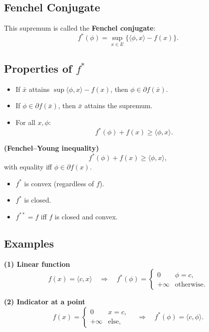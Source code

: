 \documentclass[12pt,oneside]{book}
\numberwithin{equation}{section}
\theoremstyle{definition}
\theoremstyle{plain}
\theoremstyle{remark}
\begin{document}
\subsection*{Fenchel Conjugate}

This supremum is called the \textbf{Fenchel conjugate}:
\[
f^*(\phi) = \sup_{x \in E} \{\langle \phi, x \rangle - f(x)\}.
\]

\subsection*{Properties of $f^*$}

\begin{itemize}
\item[(1)] If $\bar{x}$ attains $\sup \langle \phi,x\rangle - f(x)$, then $\phi \in \partial f(\bar{x})$.
\item[(2)] If $\phi \in \partial f(\bar{x})$, then $\bar{x}$ attains the supremum.
\item[(3)] For all $x,\phi$:
\[
f^*(\phi) + f(x) \ge \langle \phi, x \rangle.
\]
\end{itemize}

\textbf{(Fenchel--Young inequality)}
\[
f^*(\phi) + f(x) \ge \langle \phi, x \rangle,
\]
with equality iff $\phi \in \partial f(x)$.

\begin{itemize}
\item[(4)] $f^*$ is convex (regardless of $f$).
\item[(5)] $f^*$ is closed.
\item[(6)] $f^{**} = f$ iff $f$ is closed and convex.
\end{itemize}

\subsection*{Examples}

\textbf{(1) Linear function}
\[
f(x) = \langle c,x\rangle
\quad\Rightarrow\quad
f^*(\phi) =
\begin{cases}
0 & \phi = c,\\
+\infty & \text{otherwise}.
\end{cases}
\]

\textbf{(2) Indicator at a point}
\[
f(x) =
\begin{cases}
0 & x=c,\\
+\infty & \text{else},
\end{cases}
\quad\Rightarrow\quad
f^*(\phi) = \langle c,\phi\rangle.
\]
\end{document}
